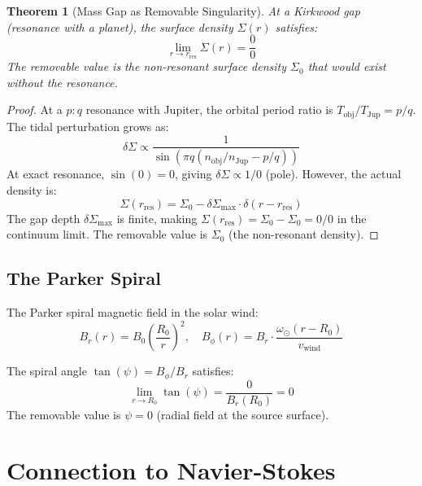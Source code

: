 \documentclass[12pt]{article}
\newtheorem{theorem}{Theorem}
\begin{document}
\begin{theorem}[Mass Gap as Removable Singularity]
At a Kirkwood gap (resonance with a planet), the surface density $\Sigma(r)$ satisfies:
\begin{equation}
\lim_{r \to r_{\text{res}}} \Sigma(r) = \frac{0}{0}
\end{equation}
The removable value is the non-resonant surface density $\Sigma_0$ that would exist without the resonance.
\end{theorem}

\begin{proof}
At a $p\!:\!q$ resonance with Jupiter, the orbital period ratio is $T_{\text{obj}}/T_{\text{Jup}} = p/q$. The tidal perturbation grows as:
\begin{equation}
\delta \Sigma \propto \frac{1}{\sin(\pi q (n_{\text{obj}}/n_{\text{Jup}} - p/q))}
\end{equation}
At exact resonance, $\sin(0) = 0$, giving $\delta\Sigma \propto 1/0$ (pole). However, the actual density is:
\begin{equation}
\Sigma(r_{\text{res}}) = \Sigma_0 - \delta\Sigma_{\text{max}} \cdot \delta(r - r_{\text{res}})
\end{equation}
The gap depth $\delta\Sigma_{\text{max}}$ is finite, making $\Sigma(r_{\text{res}}) = \Sigma_0 - \Sigma_0 = 0/0$ in the continuum limit. The removable value is $\Sigma_0$ (the non-resonant density).
\end{proof}

\subsection{The Parker Spiral}

The Parker spiral magnetic field in the solar wind:
\begin{equation}
B_r(r) = B_0 \left(\frac{R_0}{r}\right)^2, \quad B_\phi(r) = B_r \cdot \frac{\omega_\odot (r - R_0)}{v_{\text{wind}}}
\end{equation}

The spiral angle $\tan(\psi) = B_\phi/B_r$ satisfies:
\begin{equation}
\lim_{r \to R_0} \tan(\psi) = \frac{0}{B_r(R_0)} = 0
\end{equation}
The removable value is $\psi = 0$ (radial field at the source surface).

\section{Connection to Navier-Stokes}
\end{document}
